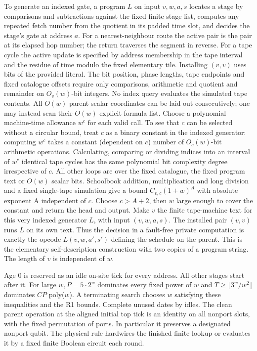To generate an indexed gate, a program \(L\) on input \(v,w,a,s\) locates a stage by comparisons and subtractions against the fixed finite stage list, computes any repeated fetch number from the quotient in its padded time slot, and decides the stage's gate at address \(a\). For a nearest-neighbour route the active pair is the pair at its elapsed hop number; the return traverses the segment in reverse. For a tape cycle the active update is specified by address membership in the tape interval and the residue of time modulo the fixed elementary tile. Installing \((v,v)\) uses bits of the provided literal. The bit position, phase lengths, tape endpoints and fixed catalogue offsets require only comparisons, arithmetic and quotient and remainder on \(O_{v}(w)\)-bit integers. No index query evaluates the simulated tape contents. All \(O(w)\) parent scalar coordinates can be laid out consecutively; one may instead scan their \(O(w)\) explicit formula list. Choose a polynomial machine-time allowance \(w^{c}\) for each valid call. To see that \(c\) can be selected without a circular bound, treat \(c\) as a binary constant in the indexed generator: computing \(w^{c}\) takes a constant (dependent on \(c\)) number of \(O_{c}(w)\)-bit arithmetic operations. Calculating, comparing or dividing indices into an interval of \(w^{c}\) identical tape cycles has the same polynomial bit complexity degree irrespective of \(c\). All other loops are over the fixed catalogue, the fixed program text or \(O(w)\) scalar bits. Schoolbook addition, multiplication and long division and a fixed single-tape simulation give a bound \(C_{v,c}(1+w)^{A}\) with absolute exponent A independent of \(c\). Choose \(c>A+2\), then \(w\) large enough to cover the constant and return the head and output. Make \(v\) the finite tape-machine text for this very indexed generator \(L\), with input \((v,w,a,s)\). The installed pair \((v,v)\) runs \(L\) on its own text. Thus the decision in a fault-free private computation is exactly the opcode \(L(v,w,a',s')\) defining the schedule on the parent. This is the elementary self-description construction with two copies of a program string. The length of \(v\) is independent of \(w\).

Age 0 is reserved as an idle on-site tick for every address. All other stages start after it. For large \(w, P=5\cdot 2^{w}\) dominates every fixed power of \(w\) and \(T\ge \lfloor 3^{w}/w^{2}\rfloor\) dominates \(C P\) poly(\(w\)). A terminating search chooses \(w\) satisfying these inequalities and the R1 bounds. Complete unused dates by idles. The clean parent operation at the aligned initial top tick is an identity on all nonport slots, with the fixed permutation of ports. In particular it preserves a designated nonport qubit. The physical rule hardwires the finished finite lookup or evaluates it by a fixed finite Boolean circuit each round.

